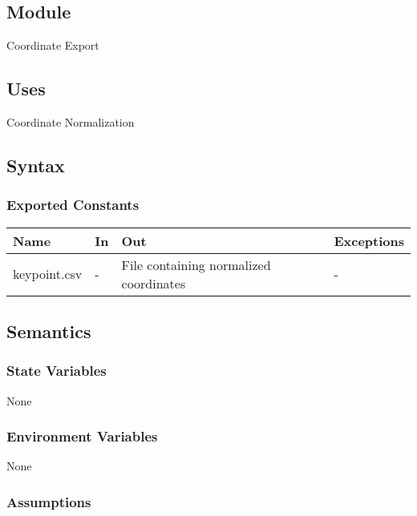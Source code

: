 \documentclass[12pt, titlepage]{article}
\begin{document}
\subsection{Module}

Coordinate Export\\

\subsection{Uses}

Coordinate Normalization\\

\subsection{Syntax}

\subsubsection{Exported Constants}

\begin{center}
\begin{tabular}{p{5cm} p{4cm} p{4cm} p{2cm}}
\hline
\textbf{Name} & \textbf{In} & \textbf{Out} & \textbf{Exceptions} \\
\hline
keypoint.csv & - & File containing normalized coordinates & - \\
\hline
\end{tabular}
\end{center}

\subsection{Semantics}

\subsubsection{State Variables}

None\\

\subsubsection{Environment Variables}

None\\

\subsubsection{Assumptions}
\end{document}
